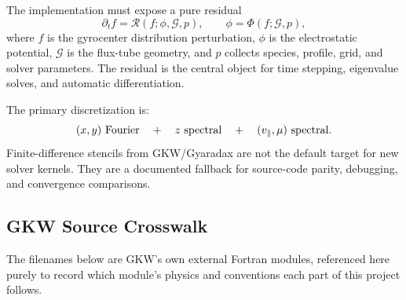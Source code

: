 \documentclass[11pt,a4paper]{article}
\newcommand{\vpar}{v_{\parallel}}
\newcommand{\RHS}{\mathcal{R}}
\begin{document}
The implementation must expose a pure residual
\begin{equation}
  \partial_t f = \RHS(f;\phi,\mathcal{G},p),
  \qquad
  \phi = \Phi(f;\mathcal{G},p),
  \label{eq:residual-contract}
\end{equation}
where \(f\) is the gyrocenter distribution perturbation, \(\phi\) is the electrostatic potential, \(\mathcal{G}\) is the flux-tube geometry, and \(p\) collects species, profile, grid, and solver parameters.  The residual is the central object for time stepping, eigenvalue solves, and automatic differentiation.

The primary discretization is:
\begin{equation}
  (x,y)\hbox{ Fourier}
  \quad+\quad
  z\hbox{ spectral}
  \quad+\quad
  (\vpar,\mu)\hbox{ spectral}.
  \label{eq:primary-discretization}
\end{equation}
Finite-difference stencils from GKW/Gyaradax are not the default target for new solver kernels.  They are a documented fallback for source-code parity, debugging, and convergence comparisons.

\subsection{GKW Source Crosswalk}

The filenames below are GKW's own external Fortran modules, referenced here
purely to record which module's physics and conventions each part of this
project follows.
\end{document}
